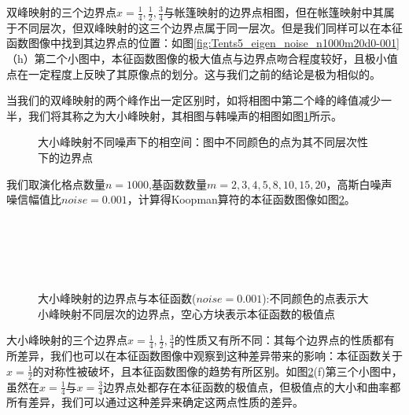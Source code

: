 双峰映射的三个边界点$x=\frac{1}{4},\frac{1}{2},\frac{3}{4}$与帐篷映射的边界点相图，但在帐篷映射中其属于不同层次，但双峰映射的这三个边界点属于同一层次。但是我们同样可以在本征函数图像中找到其边界点的位置：如图\ref{fig:Tents5_eigen_noise_n1000m20d0-001}（h）第二个小图中，本征函数图像的极大值点与边界点吻合程度较好，且极小值点在一定程度上反映了其原像点的划分。这与我们之前的结论是极为相似的。

当我们的双峰映射的两个峰作出一定区别时，如将相图中第二个峰的峰值减少一半，我们将其称之为大小峰映射，其相图与韩噪声的相图如图\ref{fig:Tents5l_noise_phase_d0}所示。

\begin{figure}[!]
  \centering
  \caption[大小峰映射不同噪声下的相空间]{大小峰映射不同噪声下的相空间：图中不同颜色的点为其不同层次性下的边界点}\label{fig:Tents5l_noise_phase_d0}
\end{figure}

我们取演化格点数量$n=1000$,基函数数量$m=2,3,4,5,8,10,15,20$，高斯白噪声噪信幅值比$noise=0.001$，计算得Koopman算符的本征函数图像如图\ref{fig:Tents5l_eigen_noise_n1000m20d0-001}。

\begin{figure}[!]
  \centering%
    \\
    \\
    \\
    \\
    \caption[大小峰映射的边界点与本征函数]{大小峰映射的边界点与本征函数($noise=0.001$):不同颜色的点表示大小峰映射不同层次的边界点，空心方块表示本征函数的极值点}\label{fig:Tents5l_eigen_noise_n1000m20d0-001}
\end{figure}

大小峰映射的三个边界点$x=\frac{1}{4},\frac{1}{2},\frac{3}{4}$的性质又有所不同：其每个边界点的性质都有所差异，我们也可以在本征函数图像中观察到这种差异带来的影响：本征函数关于$x=\frac{1}{2}$的对称性被破坏，且本征函数图像的趋势有所区别。如图\ref{fig:Tents5l_eigen_noise_n1000m20d0-001}(f)第三个小图中，虽然在$x=\frac{1}{4}$与$x=\frac{3}{4}$边界点处都存在本征函数的极值点，但极值点的大小和曲率都所有差异，我们可以通过这种差异来确定这两点性质的差异。

